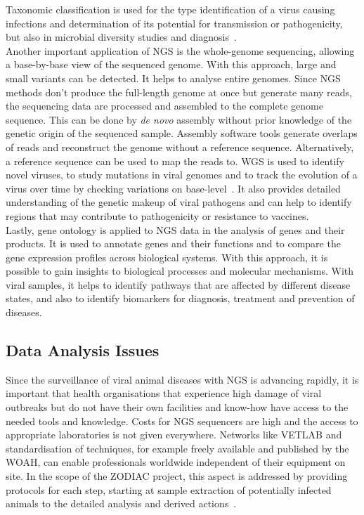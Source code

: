 Taxonomic classification is used for the type identification of a virus causing infections and determination of its potential for transmission or pathogenicity, but also in microbial diversity studies and diagnosis~\cite{dutilh2021perspective}. \\
Another important application of \ac{NGS} is the whole-genome sequencing, allowing a base-by-base view of the sequenced genome. With this approach, large and small variants can be detected. It helps to analyse entire genomes. Since \ac{NGS} methods don't produce the full-length genome at once but generate many reads, the sequencing data are processed and assembled to the complete genome sequence. This can be done by \textit{de novo} assembly without prior knowledge of the genetic origin of the sequenced sample. Assembly software tools generate overlaps of reads and reconstruct the genome without a reference sequence. Alternatively, a reference sequence can be used to map the reads to. \ac{WGS} is used to identify novel viruses, to study mutations in viral genomes and to track the evolution of a virus over time by checking variations on base-level~\cite{slatko2018overview}. It also provides detailed understanding of the genetic makeup of viral pathogens and can help to identify regions that may contribute to pathogenicity or resistance to vaccines. \\
Lastly, gene ontology is applied to \ac{NGS} data in the analysis of genes and their products. It is used to annotate genes and their functions and to compare the gene expression profiles across biological systems. With this approach, it is possible to gain insights to biological processes and molecular mechanisms. With viral samples, it helps to identify pathways that are affected by different disease states, and also to identify biomarkers for diagnosis, treatment and prevention of diseases.

\subsection{Data Analysis Issues}
Since the surveillance of viral animal diseases with \ac{NGS} is advancing rapidly, it is important that health organisations that experience high damage of viral outbreaks but do not have their own facilities and know-how have access to the needed tools and knowledge. Costs for \ac{NGS} sequencers are high and the access to appropriate laboratories is not given everywhere. Networks like \ac{VETLAB} and standardisation of techniques, for example freely available and published by the \ac{WOAH}, can enable professionals worldwide independent of their equipment on site. In the scope of the \ac{ZODIAC} project, this aspect is addressed by providing protocols for each step, starting at sample extraction of potentially infected animals to the detailed analysis and derived actions~\cite{zodiac2021}.

